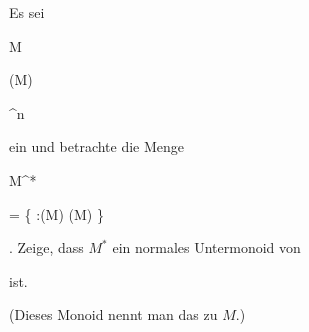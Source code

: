 {


Es sei


\mavergleichskette

{\vergleichskette

{ M
}

{ \subseteq }{ \Gamma(M)
}

{ \cong }{ \Z^n
}

{    }{
}

{   }{
}

}
{}{}{}
ein
und betrachte die Menge


\mavergleichskettedisp

{\vergleichskette

{ M^*
}

{ =} { \left\{ \varphi:\Gamma(M) \longrightarrow \Z   \mid  \varphi(M) \subseteq \N         \right\}
}

{ } {
}

{ } {
}

{ } {
}

}
{}{}{.}
Zeige, dass $M^*$ ein normales Untermonoid von

 ist.


}

{(Dieses Monoid nennt man das  {} zu $M$.)} {}
